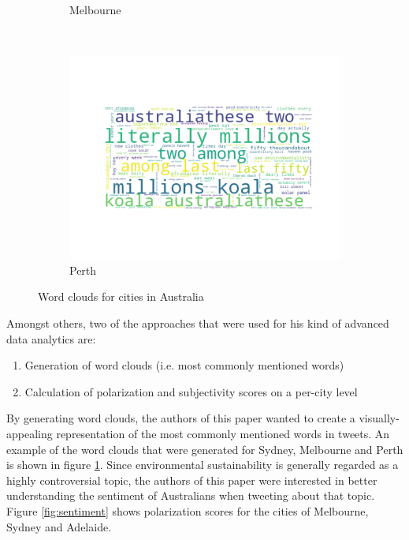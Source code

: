 \documentclass[11pt, oneside]{article}
\begin{document}
\begin{figure}
\begin{subfigure}[b]{0.3\textwidth}
        \caption{Melbourne}
    \end{subfigure}
    ~ %
    \begin{subfigure}[b]{0.3\textwidth}
        \includegraphics[width=\textwidth]{figures/perth_word_cloud.png}
        \caption{Perth}
    \end{subfigure}
    \caption{Word clouds for cities in Australia}
    \label{fig:word_clouds}
\end{figure}
\newline
Amongst others, two of the approaches that were used for his kind of advanced data analytics are:
\begin{enumerate}
    \item Generation of word clouds (i.e. most commonly mentioned words)
    \item Calculation of polarization and subjectivity scores on a per-city level
\end{enumerate}
By generating word clouds, the authors of this paper wanted to create a visually-appealing representation of the most commonly mentioned words in tweets. An example of the word clouds that were generated for Sydney, Melbourne and Perth is shown in figure \ref{fig:word_clouds}.
\newline
\newline
Since environmental sustainability is generally regarded as a highly controversial topic, the authors of this paper were interested in better understanding the sentiment of Australians when tweeting about that topic. Figure \ref{fig:sentiment} shows polarization scores for the cities of Melbourne, Sydney and Adelaide.
\end{document}
